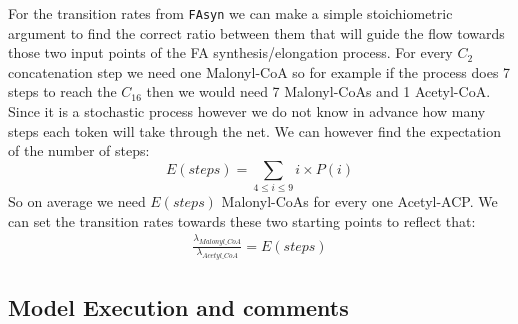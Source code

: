 For the transition rates from \texttt{FAsyn} we can make a simple
stoichiometric argument to find the correct ratio between them that
will guide the flow towards those two input points of the FA
synthesis/elongation process. For every $C_2$ concatenation step we
need one Malonyl-CoA so for example if the process does 7 steps to
reach the $C_{16}$ then we would need 7 Malonyl-CoAs and 1
Acetyl-CoA. Since it is a stochastic process however we do not know in
advance how many steps each token will take through the net. We can
however find the expectation of the number of steps:
\begin{equation*}
E(steps)=\sum_{4 \leq i \leq 9} i \times P(i)
\end{equation*}
So on average we need $E(steps)$ Malonyl-CoAs for every one
Acetyl-ACP. We can set the transition rates towards these two starting
points to reflect that:
\begin{align*}
\frac{\lambda_{Malonyl\_CoA}}{\lambda_{Acetyl\_CoA}} = E(steps)
\end{align*}

\subsection{Model Execution and comments}

